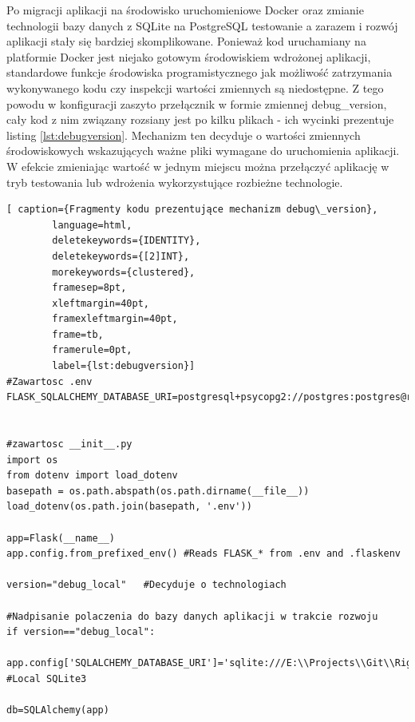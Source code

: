 \documentclass[a4paper,10pt, twoside]{report}
\begin{document}
\begin{large}
{Po migracji aplikacji na środowisko uruchomieniowe Docker oraz zmianie 
technologii bazy danych z SQLite na PostgreSQL testowanie a zarazem i rozwój 
aplikacji stały się bardziej skomplikowane. Ponieważ kod uruchamiany na 
platformie Docker jest niejako gotowym środowiskiem wdrożonej aplikacji, 
standardowe funkcje środowiska programistycznego jak możliwość zatrzymania 
wykonywanego kodu czy inspekcji wartości zmiennych są niedostępne. Z tego powodu
 w konfiguracji zaszyto przełącznik w formie zmiennej debug\_version, cały kod 
z nim związany rozsiany jest po kilku plikach - ich wycinki prezentuje listing 
\ref{lst:debugversion}. Mechanizm ten decyduje o wartości zmiennych 
środowiskowych wskazujących ważne pliki wymagane do uruchomienia aplikacji. W 
efekcie zmieniając wartość w jednym miejscu można przełączyć aplikację w tryb 
testowania lub wdrożenia wykorzystujące rozbieżne technologie.}

\begin{minipage}{\textwidth}
    \begin{lstlisting}[ caption={Fragmenty kodu prezentujące mechanizm debug\_version},
        language=html,
        deletekeywords={IDENTITY},
        deletekeywords={[2]INT},
        morekeywords={clustered},
        framesep=8pt,
        xleftmargin=40pt,
        framexleftmargin=40pt,
        frame=tb,
        framerule=0pt,
        label={lst:debugversion}]
#Zawartosc .env
FLASK_SQLALCHEMY_DATABASE_URI=postgresql+psycopg2://postgres:postgres@rightendb:5432/RightenDB


#zawartosc __init__.py
import os
from dotenv import load_dotenv
basepath = os.path.abspath(os.path.dirname(__file__))
load_dotenv(os.path.join(basepath, '.env'))

app=Flask(__name__)
app.config.from_prefixed_env() #Reads FLASK_* from .env and .flaskenv

version="debug_local"   #Decyduje o technologiach

#Nadpisanie polaczenia do bazy danych aplikacji w trakcie rozwoju 
if version=="debug_local":
    app.config['SQLALCHEMY_DATABASE_URI']='sqlite:///E:\\Projects\\Git\\Righten\\Sources\\Database\\Righten_mock.sqlite3' #Local SQLite3

db=SQLAlchemy(app)\end{lstlisting}
\end{minipage}



\end{large}
\end{document}
